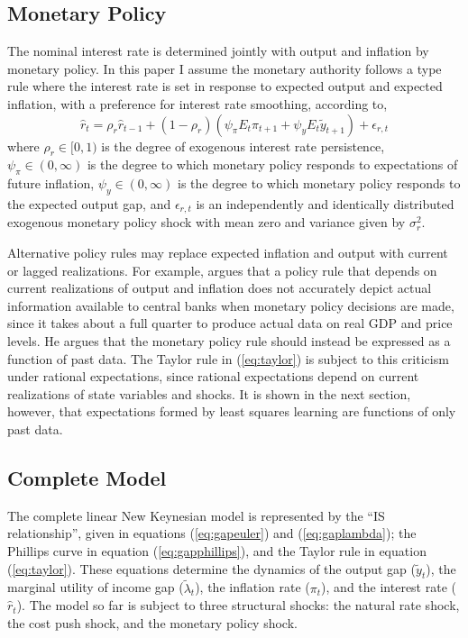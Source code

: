 \documentclass[10pt]{article}
\newcommand{\beq}{\begin{equation}}
\newcommand{\eeq}{\end{equation}}
\newcommand{\citee}[1]{\citet{#1}}
\newcommand{\h}[1]{\hat{#1}}
\begin{document}
\subsection{Monetary Policy}
The nominal interest rate is determined jointly with output and inflation by monetary policy.  In this paper I assume the monetary authority follows a \citee{taylor1993} type rule where the interest rate is set in response to expected output and expected inflation, with a preference for interest rate smoothing, according to,
\beq \label{eq:taylor} \h{r}_t = \rho_r \h{r}_{t-1} + (1-\rho_r) \left(\psi_{\pi} E_t \pi_{t+1} + \psi_y E_t \tilde{y}_{t+1} \right) + \epsilon_{r,t} \eeq
where $\rho_r \in [0,1)$ is the degree of exogenous interest rate persistence, $\psi_{\pi} \in (0,\infty)$ is the degree to which monetary policy responds to expectations of future inflation, $\psi_y \in (0,\infty)$ is the degree to which monetary policy responds to the expected output gap, and $\epsilon_{r,t}$ is an independently and identically distributed exogenous monetary policy shock with mean zero and variance given by $\sigma_r^2$.  

Alternative policy rules may replace expected inflation and output with current or lagged realizations.  For example, \citee{mccallum1997} argues that a policy rule that depends on current realizations of output and inflation does not accurately depict actual information available to central banks when monetary policy decisions are made, since it takes about a full quarter to produce actual data on real GDP and price levels.  He argues that the monetary policy rule should instead be expressed as a function of past data.  The Taylor rule in (\ref{eq:taylor}) is subject to this criticism under rational expectations, since rational expectations depend on current realizations of state variables and shocks.  It is shown in the next section, however, that expectations formed by least squares learning are functions of only past data.

\subsection{Complete Model}
The complete linear New Keynesian model is represented by the ``IS relationship'', given in equations (\ref{eq:gapeuler}) and (\ref{eq:gaplambda}); the Phillips curve in equation (\ref{eq:gapphillips}), and the Taylor rule in equation (\ref{eq:taylor}).  These equations determine the dynamics of the output gap ($\tilde{y}_t$), the marginal utility of income gap ($\tilde{\lambda}_t$), the inflation rate ($\pi_t$), and the interest rate ($\h{r}_t$).  The model so far is subject to three structural shocks: the natural rate shock, the cost push shock, and the monetary policy shock.
\end{document}
